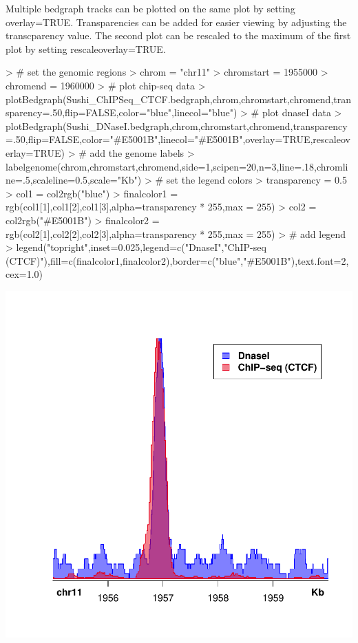 \documentclass{article}
\begin{document}
Multiple bedgraph tracks can be plotted on the same plot by setting overlay=TRUE.  Transparencies can be added for easier viewing by adjusting the transcparency value.  The second plot can be rescaled to the maximum of the first plot by setting rescaleoverlay=TRUE.

\begin{center}
\begin{Schunk}
\begin{Sinput}
> # set the genomic regions
> chrom            = "chr11"
> chromstart       = 1955000
> chromend         = 1960000
> # plot chip-seq data
> plotBedgraph(Sushi_ChIPSeq_CTCF.bedgraph,chrom,chromstart,chromend,transparency=.50,flip=FALSE,color="blue",linecol="blue")
> # plot dnaseI data
> plotBedgraph(Sushi_DNaseI.bedgraph,chrom,chromstart,chromend,transparency=.50,flip=FALSE,color="#E5001B",linecol="#E5001B",overlay=TRUE,rescaleoverlay=TRUE)
> # add the genome labels
> labelgenome(chrom,chromstart,chromend,side=1,scipen=20,n=3,line=.18,chromline=.5,scaleline=0.5,scale="Kb")
> # set the legend colors
> transparency = 0.5
> col1 = col2rgb("blue")
> finalcolor1 = rgb(col1[1],col1[2],col1[3],alpha=transparency * 255,max = 255)
> col2 = col2rgb("#E5001B")
> finalcolor2 = rgb(col2[1],col2[2],col2[3],alpha=transparency * 255,max = 255)
> # add legend
> legend("topright",inset=0.025,legend=c("DnaseI","ChIP-seq (CTCF)"),fill=c(finalcolor1,finalcolor2),border=c("blue","#E5001B"),text.font=2,cex=1.0)
\end{Sinput}
\end{Schunk}
\includegraphics{Sushi-012}
\end{center}
\end{document}

